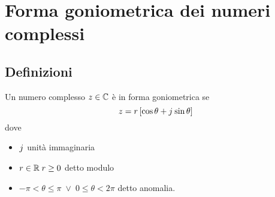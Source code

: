 \chapter{Forma goniometrica dei numeri complessi}
\section{Definizioni}
\begin{defn}
	Un numero complesso $z\in\mathbb{C}$ è in forma goniometrica se
	\[z=r\left[\cos\theta+j\mkern1mu\sin\theta \right] \] dove
	\begin{itemize}
		\item $j\mkern1mu$ unità immaginaria
		\item $r\in\mathbb{R}\; r\geq 0$ detto modulo
		\item $-\pi <\theta\leq\pi\; \vee\; 0\leq\theta<2\pi$ detto anomalia.
	\end{itemize}
\end{defn}
